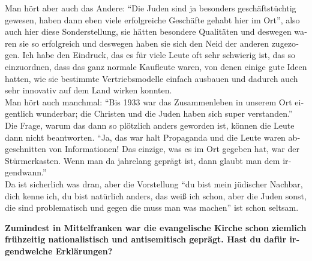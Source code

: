 \begin{otherlanguage}{ngerman}
Man hört aber auch das Andere: "`Die Juden sind ja besonders geschäftstüchtig gewesen, haben dann eben viele erfolgreiche Geschäfte gehabt hier im Ort"', also auch hier diese Sonderstellung, sie hätten besondere Qualitäten und deswegen waren sie so erfolgreich und deswegen haben sie sich den Neid der anderen zugezogen. Ich habe den Eindruck, das es für viele Leute oft sehr schwierig ist, das so einzuordnen, dass das ganz normale Kaufleute waren, von denen einige gute Ideen hatten, wie sie bestimmte Vertriebsmodelle einfach ausbauen und dadurch auch sehr innovativ auf dem Land wirken konnten.\\ 
Man hört auch manchmal: "`Bis 1933 war das Zusammenleben in unserem Ort eigentlich wunderbar; die Christen und die Juden haben sich super verstanden."' Die Frage, warum das dann so plötzlich anders geworden ist, können die Leute dann nicht beantworten. "`Ja, das war halt Propaganda und die Leute waren abgeschnitten von Informationen! Das einzige, was es im Ort gegeben hat, war der Stürmerkasten. Wenn man da jahrelang geprägt ist, dann glaubt man dem irgendwann."'\\ 
Da ist sicherlich was dran, aber die Vorstellung "`du bist mein jüdischer Nachbar, dich kenne ich, du bist natürlich anders, das weiß ich schon, aber die Juden sonst, die sind problematisch und gegen die muss man was machen"' ist schon seltsam. 
 
\textbf{Zumindest in Mittelfranken war die evangelische Kirche schon ziemlich frühzeitig nationalistisch und antisemitisch geprägt. Hast du dafür irgendwelche Erklärungen?} 


\end{otherlanguage}
